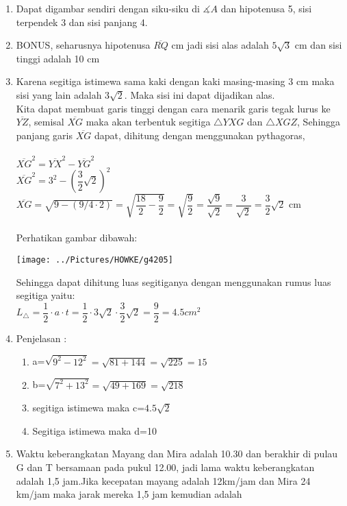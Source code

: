 \documentclass[12pt,a4paper]{article}
\begin{document}
	\begin{enumerate}
		\item Dapat digambar sendiri dengan siku-siku di $\measuredangle A$ dan hipotenusa 5, sisi terpendek 3 dan sisi panjang 4.
		\item BONUS, seharusnya hipotenusa $\overline{RQ}$ cm jadi sisi alas adalah $5\sqrt{3}$ cm dan sisi tinggi adalah 10 cm
		\item Karena segitiga istimewa sama kaki dengan kaki masing-masing 3 cm maka sisi yang lain adalah $3\sqrt{2}$. Maka sisi ini dapat dijadikan alas. 
		\\
		Kita dapat membuat garis tinggi dengan cara menarik garis tegak lurus ke $\overline{YZ}$, semisal $\overline{XG}$
		maka akan terbentuk segitiga $\triangle YXG$ dan $\triangle XGZ$, 
		Sehingga panjang garis $\overline{XG}$ dapat, dihitung dengan menggunakan pythagoras, \\
		\\
		$\overline{XG}^2=\overline{YX}^2 - \overline{YG}^2 $\\
		$\overline{XG}^2 = 3^2 - (\dfrac{3}{2}\sqrt{2})^2 $
		$\overline{XG}=\sqrt{9-(9/4\cdot 2)}=\sqrt{\dfrac{18}{2}-\dfrac{9}{2}}=\sqrt{\dfrac{9}{2}}=\dfrac{\sqrt{9}}{\sqrt{2}}=\dfrac{3}{\sqrt{2}}=\dfrac{3}{2}\sqrt{2}$ cm
		\\
		\\
		Perhatikan gambar dibawah: 
		\\
		\begin{center}
		\texttt{[image: ../Pictures/HOWKE/g4205]}
		\end{center}
		
		Sehingga dapat dihitung luas segitiganya dengan menggunakan rumus luas segitiga yaitu:\\
		
		$L_\triangle = \dfrac{1}{2}\cdot a \cdot t= \dfrac{1}{2}\cdot 3\sqrt{2}\cdot \dfrac{3}{2}\sqrt{2}=\dfrac{9}{2}=4.5cm^2$
		\item Penjelasan :
		\begin{enumerate}
			\item a=$\sqrt{9^2-12^2}=\sqrt{81+144}=\sqrt{225}=15$
			\item b=$\sqrt{7^2+13^2}=\sqrt{49+169}=\sqrt{218} $
			\item 
			segitiga istimewa maka c=$4.5\sqrt{2}$
			\item Segitiga istimewa maka d=10
		\end{enumerate}
		\item Waktu keberangkatan Mayang dan Mira adalah 10.30 dan berakhir di pulau G dan T bersamaan pada pukul 12.00, jadi lama waktu keberangkatan adalah 1,5 jam.Jika kecepatan mayang adalah 12km/jam dan Mira 24 km/jam maka jarak mereka 1,5 jam kemudian adalah 
		

\end{enumerate}
\end{document}
